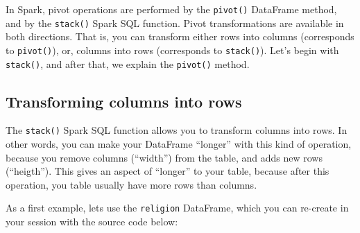 \documentclass[
  11pt,
  letterpaper,
  DIV=11,
  numbers=noendperiod]{scrreprt}
\newenvironment{Shaded}{\begin{snugshade}}{\end{snugshade}}
\newcommand{\DecValTok}[1]{\textcolor[rgb]{0.68,0.00,0.00}{#1}}
\newcommand{\NormalTok}[1]{\textcolor[rgb]{0.00,0.23,0.31}{#1}}
\newcommand{\OperatorTok}[1]{\textcolor[rgb]{0.37,0.37,0.37}{#1}}
\newcommand{\StringTok}[1]{\textcolor[rgb]{0.13,0.47,0.30}{#1}}
\begin{document}
In Spark, pivot operations are performed by the \texttt{pivot()}
DataFrame method, and by the \texttt{stack()} Spark SQL function. Pivot
transformations are available in both directions. That is, you can
transform either rows into columns (corresponds to \texttt{pivot()}),
or, columns into rows (corresponds to \texttt{stack()}). Let's begin
with \texttt{stack()}, and after that, we explain the \texttt{pivot()}
method.

\hypertarget{transforming-columns-into-rows}{%
\subsection{Transforming columns into
rows}\label{transforming-columns-into-rows}}

The \texttt{stack()} Spark SQL function allows you to transform columns
into rows. In other words, you can make your DataFrame ``longer'' with
this kind of operation, because you remove columns (``width'') from the
table, and adds new rows (``heigth''). This gives an aspect of
``longer'' to your table, because after this operation, you table
usually have more rows than columns.

As a first example, lets use the \texttt{religion} DataFrame, which you
can re-create in your session with the source code below:

\begin{Shaded}
\end{Shaded}
\end{document}
